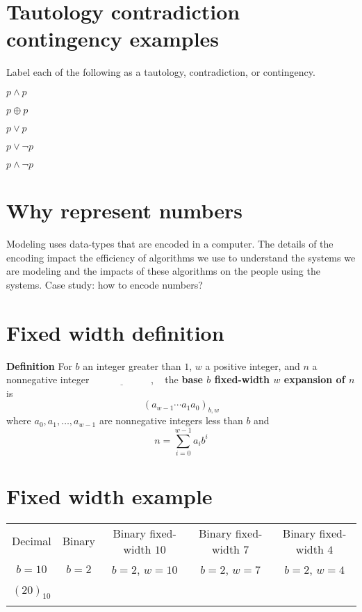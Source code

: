 \documentclass[12pt, oneside]{article}
\begin{document}
\section*{Tautology contradiction contingency examples}


Label each of the following as a tautology, contradiction, or contingency.

$p \land p$

\vfill

$p \oplus p$

\vfill

$p \lor p$

\vfill

$p \lor \lnot p$

\vfill

$p \land \lnot p$

\vfill

 \vfill
\section*{Why represent numbers}


Modeling uses data-types that are encoded in a computer.
The details of the encoding impact the efficiency of algorithms
we use to understand the systems we are modeling and the 
impacts of these algorithms on the people using the systems.
Case study: how to encode numbers?

\vfill \vfill
\section*{Fixed width definition}


{\bf Definition} For $b$ an integer greater than $1$, $w$ a positive integer, 
and $n$ a nonnegative integer
$\underline{\phantom{\hspace{1in}}}$, ~
the {\bf base $b$ fixed-width $w$ expansion of $n$}  is
\[
(a_{w-1} \cdots a_1 a_0)_{b,w}
\]
where  $a_0, a_1, \ldots, a_{w-1}$ are nonnegative integers less than $b$ and
\[
n =  \sum_{i=0}^{w-1} a_{i} b^{i}
\]
 \vfill
\section*{Fixed width example}


\begin{center}
    \begin{tabular}{|c|c|c|c|c|}
    \hline
    Decimal &  Binary  & Binary fixed-width $10$& Binary fixed-width $7$ & Binary fixed-width $4$\\
    $b=10$ & $b=2$ & $b=2$, $w =  10$& $b=2$, $w =  7$& $b=2$, $w =  4$ \\
    \hline 
    &&&&  \\
    $(20)_{10}$&\phantom{$(10100)_{2}$\qquad\qquad}&&  &\\
    &&&&  \\
\hline
    \end{tabular}
    \end{center}
 \vfill
\end{document}
